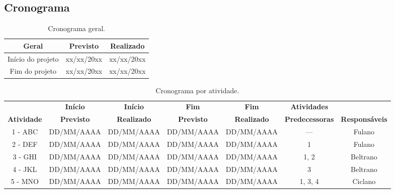 \begin{landscape}

\chapter{Cronograma}

\begin{table}[htpb]
\begin{center}
\caption{Cronograma geral.}
\begin{tabular}{|c|c|c|}
\hline
\textbf{Geral}          & \textbf{Previsto} & \textbf{Realizado} \\ \hline
Início do projeto       & xx/xx/20xx        & xx/xx/20xx         \\ \hline
Fim do projeto          & xx/xx/20xx        & xx/xx/20xx         \\ \hline
\end{tabular}
\end{center}
\end{table}

\begin{table}[htpb]
\begin{center}
\caption{Cronograma por atividade.}
\begin{tabular}{|c|c|c|c|c|c|c|}
\hline
& \textbf{Início} & \textbf{Início} & \textbf{Fim} & \textbf{Fim} & \textbf{Atividades} & \\
\textbf{Atividade} & \textbf{Previsto} & \textbf{Realizado} & \textbf{Previsto} & \textbf{Realizado} & \textbf{Predecessoras} & \textbf{Responsáveis}\\ \hline
1 - ABC                       & DD/MM/AAAA               & DD/MM/AAAA                & DD/MM/AAAA               & DD/MM/AAAA                & ---                               & Fulano \\ \hline
2 - DEF                       & DD/MM/AAAA               & DD/MM/AAAA                & DD/MM/AAAA               & DD/MM/AAAA                & 1                                 & Fulano \\ \hline
3 - GHI                       & DD/MM/AAAA               & DD/MM/AAAA                & DD/MM/AAAA               & DD/MM/AAAA                & 1, 2                              & Beltrano \\ \hline
4 - JKL                       & DD/MM/AAAA               & DD/MM/AAAA                & DD/MM/AAAA               & DD/MM/AAAA                & 3                                 & Beltrano \\ \hline
5 - MNO                       & DD/MM/AAAA               & DD/MM/AAAA                & DD/MM/AAAA               & DD/MM/AAAA                & 1, 3, 4                           & Ciclano \\ \hline
\end{tabular}
\end{center}
\end{table}




\end{landscape}
